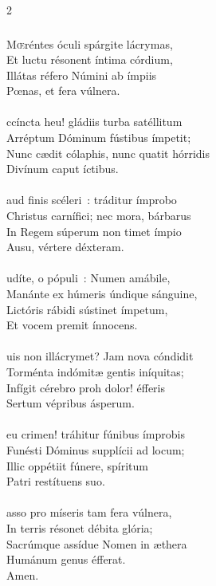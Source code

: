 \documentclass[9pt,twoside]{extarticle}
\begin{document}
\begin{multicols}{2}
\subsubsection*{\center{}}
\lettrine{M}œréntes óculi spárgite lácrymas,\\
Et luctu résonent íntima córdium,\\
Illátas réfero Númini ab ímpiis\\
Pœnas, et fera vúlnera.\\
\\
ccíncta heu! gládiis turba satéllitum\\
Arréptum Dóminum fústibus ímpetit;\\
Nunc cædit cólaphis, nunc quatit hórridis\\
Divínum caput íctibus.\\
\\
aud finis scéleri~: tráditur ímprobo\\
Christus carnífici; nec mora, bárbarus\\
In Regem súperum non timet ímpio\\
Ausu, vértere déxteram.\\
\\
udíte, o pópuli~: Numen amábile,\\
Manánte ex húmeris úndique sánguine,\\
Lictóris rábidi sústinet ímpetum,\\
Et vocem premit ínnocens.\\
\\
uis non illácrymet? Jam nova cóndidit\\
Torménta indómitæ gentis iníquitas;\\
Infígit cérebro proh dolor! éfferis\\
Sertum vépribus ásperum.\\
\\
eu crimen! tráhitur fúnibus ímprobis\\
Funésti Dóminus supplícii ad locum;\\
Illic oppétiit fúnere, spíritum\\
Patri restítuens suo.\\
\\
asso pro míseris tam fera vúlnera,\\
In terris résonet débita glória;\\
Sacrúmque assídue Nomen in æthera\\
Humánum genus éfferat.\\
Amen.


\end{multicols}
\end{document}
